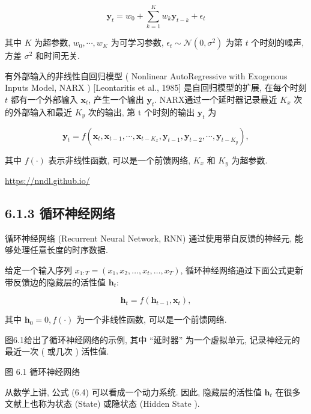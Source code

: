 \documentclass[10pt]{article}
\begin{document}
\begin{equation*}
\boldsymbol{y}_{t}=w_{0}+\sum_{k=1}^{K} w_{k} \boldsymbol{y}_{t-k}+\epsilon_{t} \tag{6.2}
\end{equation*}


其中 $K$ 为超参数, $w_{0}, \cdots, w_{K}$ 为可学习参数, $\epsilon_{t} \sim \mathcal{N}\left(0, \sigma^{2}\right)$ 为第 $t$ 个时刻的噪声,方差 $\sigma^{2}$ 和时间无关.

有外部输入的非线性自回归模型 ( Nonlinear AutoRegressive with Exogenous Inputs Model, NARX ) [Leontaritis et al., 1985] 是自回归模型的扩展, 在每个时刻 $t$ 都有一个外部输入 $\boldsymbol{x}_{t}$, 产生一个输出 $\boldsymbol{y}_{t}$. NARX通过一个延时器记录最近 $K_{x}$ 次的外部输入和最近 $K_{y}$ 次的输出, 第 $\mathrm{t}$ 个时刻的输出 $\boldsymbol{y}_{t}$ 为


\begin{equation*}
\boldsymbol{y}_{t}=f\left(\boldsymbol{x}_{t}, \boldsymbol{x}_{t-1}, \cdots, \boldsymbol{x}_{t-K_{x}}, \boldsymbol{y}_{t-1}, \boldsymbol{y}_{t-2}, \cdots, \boldsymbol{y}_{t-K_{y}}\right), \tag{6.3}
\end{equation*}


其中 $f(\cdot)$ 表示非线性函数, 可以是一个前馈网络, $K_{x}$ 和 $K_{y}$ 为超参数.

\href{https://nndl.github.io/}{https://nndl.github.io/}

\subsection*{6.1.3 循环神经网络}
循环神经网络 (Recurrent Neural Network, RNN) 通过使用带自反馈的神经元, 能够处理任意长度的时序数据.

给定一个输入序列 $x_{1: T}=\left(x_{1}, x_{2}, \ldots, x_{t}, \ldots, x_{T}\right)$, 循环神经网络通过下面公式更新带反馈边的隐藏层的活性值 $\boldsymbol{h}_{t}:$


\begin{equation*}
\boldsymbol{h}_{t}=f\left(\boldsymbol{h}_{t-1}, \boldsymbol{x}_{t}\right), \tag{6.4}
\end{equation*}


其中 $\boldsymbol{h}_{0}=0, f(\cdot)$ 为一个非线性函数, 可以是一个前馈网络.

图6.1给出了循环神经网络的示例, 其中 “延时器” 为一个虚拟单元, 记录神经元的最近一次 ( 或几次 ) 活性值.



图 6.1 循环神经网络

从数学上讲, 公式 (6.4) 可以看成一个动力系统. 因此, 隐藏层的活性值 $\boldsymbol{h}_{t}$ 在很多文献上也称为状态 (State) 或隐状态 (Hidden State ).
\end{document}
